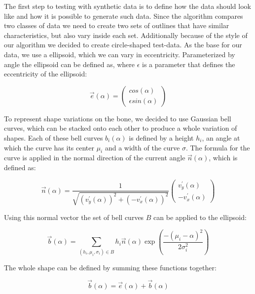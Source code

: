 \documentclass[pdftex,12pt,a4paper]{report}
\begin{document}
The first step to testing with synthetic data is to define how the data should look like and how it is possible to generate such data. Since the algorithm compares two classes of data we need to create two sets of outlines that have similar characteristics, but also vary inside each set. Additionally because of the style of our algorithm we decided to create circle-shaped test-data. As the base for our data, we use a ellipsoid, which we can vary in eccentricity. Parameterized by angle the ellipsoid can be defined as, where $\epsilon$ is a parameter that defines the eccentricity of the ellipsoid:

\begin{equation}
\vec{e}(\alpha) = \left( \begin{array}{c}
cos(\alpha) \\
\epsilon sin(\alpha)
\end{array} \right) 
\end{equation}

To represent shape variations on the bone, we decided to use Gaussian bell curves, which can be stacked onto each other to produce a whole variation of shapes. Each of these bell curves $b_i(\alpha)$ is defined by a height $h_i$, an angle at which the curve has its center $\mu_i$ and a width of the curve $\sigma$. The formula for the curve is applied in the normal direction of the current angle $\vec{n}(\alpha)$, which is defined as:

\begin{equation}
\vec{n}(\alpha) = \frac{1}{\sqrt{(v_y^\prime(\alpha))^2 + (-v_x^\prime(\alpha))^2}}\left( \begin{array}{c}
v_y^\prime(\alpha) \\
-v_x^\prime(\alpha)
\end{array} \right)
\end{equation}

Using this normal vector the set of bell curves $B$ can be applied to the ellipsoid:

\begin{equation}
\vec{b}(\alpha) = \sum_{(h_i, \mu_i, \sigma_i) \in B}h_i \vec{n}(\alpha) \exp\left(\frac{-(\mu_i - \alpha)^2}{2 \sigma_i^2} \right )
\end{equation}

The whole shape can be defined by summing these functions together:

\begin{equation}
\vec{b}(\alpha) = \vec{e}(\alpha) + \vec{b}(\alpha)
\end{equation}
\end{document}
